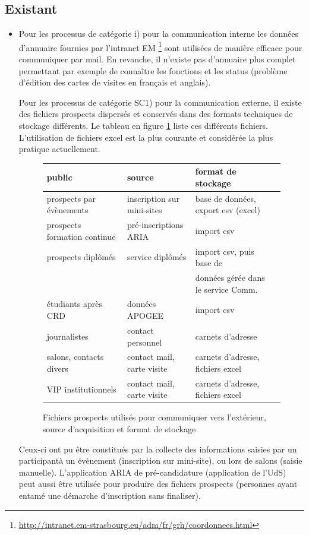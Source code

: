\documentclass{book}
\begin{document}
\subsection{Existant}
\begin{itemize}
\item Pour les processus de catégorie i) pour la communication interne
	les données d'annuaire fournies par l'intranet EM %
	\footnote{\url{http://intranet.em-strasbourg.eu/adm/fr/grh/coordonnees.html}}
	sont utilisées de manière efficace pour communiquer par mail.
	En revanche, il n'existe pas d'annuaire plus complet permettant
	par exemple de connaître les fonctions et les status  (problème d'édition des 
	cartes de visites en français et anglais).


	Pour les processus de catégorie SC1) pour la communication externe,
	il existe des fichiers prospects dispersés et conservés dans des 
	formats techniques de stockage différents. Le tableau en figure 
	\ref{fg:comm_prospects} liste ces différents fichiers.
	L'utilisation de fichiers excel est la plus courante et considérée 
	la plus pratique actuellement.

\begin{figure}[hbt]
\begin{center}
	\begin{tabular}{llll}
	\hline
	\hline
	public	& source	 & format de stockage \\
	\hline
	prospects par évènements & inscription sur  mini-sites &  base de données, export csv (excel)\\
	prospects formation continue  & pré-inscriptions ARIA & import csv \\
	prospects diplômés      & service diplômés &  import csv, puis base de \\
					&			 &  données gérée dans le service Comm. \\
	étudiants après CRD 	& données APOGEE & import csv \\
	journalistes 		& contact personnel	& carnets d'adresse \\
	salons, contacts divers	& contact mail, carte visite & carnets d'adresse, fichiers excel\\ 
	VIP institutionnels	& contact mail, carte visite & carnets d'adresse, fichiers excel\\ 
	\hline
	\hline
	\end{tabular}
\end{center}
\caption{Fichiers prospects utilisés pour communiquer vers l'extérieur, source 
	d'acquisition et format de stockage}
\label{fg:comm_prospects}
\end{figure}
	Ceux-ci  ont pu être constitués par la collecte des informations saisies 
	par un participantà un évènement (inscription sur mini-site), ou lors de 
      salons (saisie manuelle). L'application ARIA de pré-candidature (application de l'UdS)
      peut aussi être utilisée pour produire des fichiers prospects (personnes 
	ayant entamé une démarche d'inscription sans finaliser).


\end{itemize}
\end{document}
